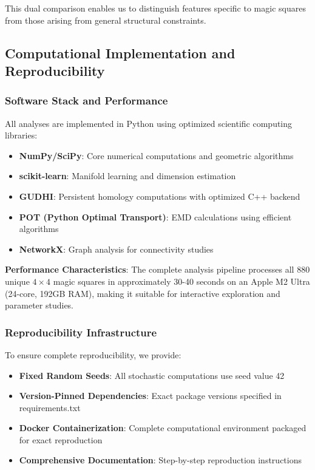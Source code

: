 This dual comparison enables us to distinguish features specific to magic squares from those arising from general structural constraints.

\subsection{Computational Implementation and Reproducibility}

\subsubsection{Software Stack and Performance}

All analyses are implemented in Python using optimized scientific computing libraries:

\begin{itemize}
    \item \textbf{NumPy/SciPy}: Core numerical computations and geometric algorithms
    \item \textbf{scikit-learn}: Manifold learning and dimension estimation
    \item \textbf{GUDHI}: Persistent homology computations with optimized C++ backend
    \item \textbf{POT (Python Optimal Transport)}: EMD calculations using efficient algorithms
    \item \textbf{NetworkX}: Graph analysis for connectivity studies
\end{itemize}

\textbf{Performance Characteristics}: The complete analysis pipeline processes all 880 unique $4 \times 4$ magic squares in approximately 30-40 seconds on an Apple M2 Ultra (24-core, 192GB RAM), making it suitable for interactive exploration and parameter studies.

\subsubsection{Reproducibility Infrastructure}

To ensure complete reproducibility, we provide:

\begin{itemize}
    \item \textbf{Fixed Random Seeds}: All stochastic computations use seed value 42
    \item \textbf{Version-Pinned Dependencies}: Exact package versions specified in requirements.txt
    \item \textbf{Docker Containerization}: Complete computational environment packaged for exact reproduction
    \item \textbf{Comprehensive Documentation}: Step-by-step reproduction instructions
\end{itemize}

